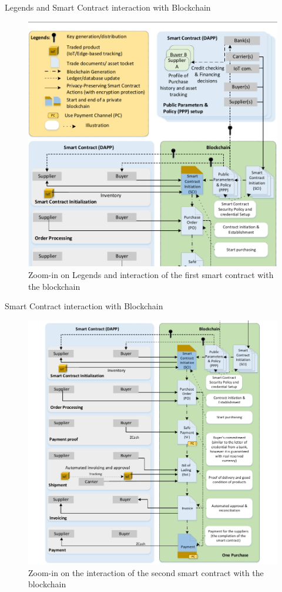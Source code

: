 \documentclass[11pt]{beamer}
\begin{document}
\begin{frame}{Legends and Smart Contract interaction with Blockchain}
\begin{figure}[!ht]
\includegraphics[scale=0.20]{supplychainlegendsscb.png}
\caption{Zoom-in on Legends and interaction of the first smart contract with the blockchain}
\label{fig:supplychainlegendsscb}
\end{figure}
\end{frame}

\begin{frame}{Smart Contract interaction with Blockchain}
\begin{figure}[!ht]
\includegraphics[scale=0.20]{supplychainscb.png}
\caption{Zoom-in on the interaction of the second smart contract with the blockchain}
\label{fig:supplychainscb}
\end{figure}
\end{frame}
\end{document}
